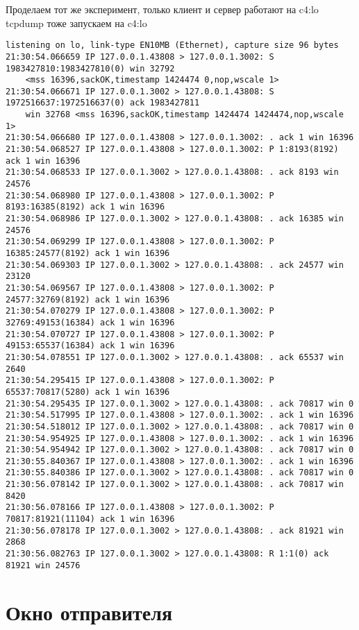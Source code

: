 \documentclass[a4paper,12pt]{article}
\begin{document}
Проделаем тот же эксперимент, только клиент и сервер работают на c4:lo
tcpdump тоже запускаем на c4:lo

\begin{Verbatim}
listening on lo, link-type EN10MB (Ethernet), capture size 96 bytes
21:30:54.066659 IP 127.0.0.1.43808 > 127.0.0.1.3002: S 1983427810:1983427810(0) win 32792 
	<mss 16396,sackOK,timestamp 1424474 0,nop,wscale 1>
21:30:54.066671 IP 127.0.0.1.3002 > 127.0.0.1.43808: S 1972516637:1972516637(0) ack 1983427811 
	win 32768 <mss 16396,sackOK,timestamp 1424474 1424474,nop,wscale 1>
21:30:54.066680 IP 127.0.0.1.43808 > 127.0.0.1.3002: . ack 1 win 16396 
21:30:54.068527 IP 127.0.0.1.43808 > 127.0.0.1.3002: P 1:8193(8192) ack 1 win 16396 
21:30:54.068533 IP 127.0.0.1.3002 > 127.0.0.1.43808: . ack 8193 win 24576 
21:30:54.068980 IP 127.0.0.1.43808 > 127.0.0.1.3002: P 8193:16385(8192) ack 1 win 16396 
21:30:54.068986 IP 127.0.0.1.3002 > 127.0.0.1.43808: . ack 16385 win 24576 
21:30:54.069299 IP 127.0.0.1.43808 > 127.0.0.1.3002: P 16385:24577(8192) ack 1 win 16396 
21:30:54.069303 IP 127.0.0.1.3002 > 127.0.0.1.43808: . ack 24577 win 23120 
21:30:54.069567 IP 127.0.0.1.43808 > 127.0.0.1.3002: P 24577:32769(8192) ack 1 win 16396 
21:30:54.070279 IP 127.0.0.1.43808 > 127.0.0.1.3002: P 32769:49153(16384) ack 1 win 16396 
21:30:54.070727 IP 127.0.0.1.43808 > 127.0.0.1.3002: P 49153:65537(16384) ack 1 win 16396 
21:30:54.078551 IP 127.0.0.1.3002 > 127.0.0.1.43808: . ack 65537 win 2640 
21:30:54.295415 IP 127.0.0.1.43808 > 127.0.0.1.3002: P 65537:70817(5280) ack 1 win 16396 
21:30:54.295435 IP 127.0.0.1.3002 > 127.0.0.1.43808: . ack 70817 win 0 
21:30:54.517995 IP 127.0.0.1.43808 > 127.0.0.1.3002: . ack 1 win 16396 
21:30:54.518012 IP 127.0.0.1.3002 > 127.0.0.1.43808: . ack 70817 win 0 
21:30:54.954925 IP 127.0.0.1.43808 > 127.0.0.1.3002: . ack 1 win 16396 
21:30:54.954942 IP 127.0.0.1.3002 > 127.0.0.1.43808: . ack 70817 win 0 
21:30:55.840367 IP 127.0.0.1.43808 > 127.0.0.1.3002: . ack 1 win 16396 
21:30:55.840386 IP 127.0.0.1.3002 > 127.0.0.1.43808: . ack 70817 win 0 
21:30:56.078142 IP 127.0.0.1.3002 > 127.0.0.1.43808: . ack 70817 win 8420 
21:30:56.078166 IP 127.0.0.1.43808 > 127.0.0.1.3002: P 70817:81921(11104) ack 1 win 16396 
21:30:56.078178 IP 127.0.0.1.3002 > 127.0.0.1.43808: . ack 81921 win 2868 
21:30:56.082763 IP 127.0.0.1.3002 > 127.0.0.1.43808: R 1:1(0) ack 81921 win 24576 
\end{Verbatim}

\section{Окно отправителя}
\end{document}

